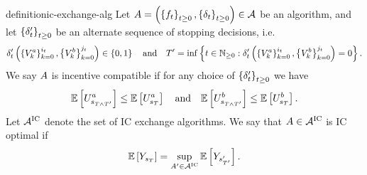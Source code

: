 \begin{restatable}{definition}{ic-exchange-alg}
    \label{def:ic-exchange-alg}
    Let
    \(
        A
        =
        \left(
            \left\{
                f_{t}
            \right\}_{t\geq 0}, 
            \left\{
                \delta_{t}
            \right\}_{t\geq 0}
        \right)
        \in\mathcal{A}
    \) be an algorithm, 
    and let
    \(
        \left\{
            \delta'_{t}
        \right\}_{t\geq 0}
    \)
    be an alternate sequence of stopping decisions, i.e.
    \[
        \delta'_{t}
        \left(
            \left\{
                V^a_{
                    k
                }
            \right\}_{k=0}^{
                i_{t}
            },
            \left\{
                V^b_{
                    k
                }
            \right\}_{k=0}^{
                j_{t}
            }
        \right)
        \in\left\{0,1\right\}
        \quad
        \text{and}
        \quad
        T'
        =\inf\left\{
            t\in\mathbb{N}_{\geq 0} :
            \delta'_{t}\left(
                \left\{
                    V^a_{k}
                \right\}_{k=0}^{i_{t}}
                ,
                \left\{
                    V^b_{k}
                \right\}_{k=0}^{j_{t}}
            \right)=0
        \right\} .
    \]
    We say $A$ is incentive compatible if for any choice of 
    \(
        \left\{
            \delta'_{t}
        \right\}_{t\geq 0}
    \)
    we have
    \[
        \mathbb{E}\left[
            U^a_{
                s_{
                    T\wedge T'
                }
            }
        \right]
        \leq
        \mathbb{E}\left[
            U^a_{
                s_{
                    T
                }
            }
        \right]
        \quad
        \text{and}
        \quad
        \mathbb{E}\left[
            U^b_{
                s_{
                    T\wedge T'
                }
            }
        \right]
        \leq
        \mathbb{E}\left[
            U^b_{
                s_{
                    T
                }
            }
        \right] .
    \] 
    Let $\mathcal{A}^{\text{IC}}$ denote the set of IC exchange algorithms.
    We say that $A\in\mathcal{A}^{\text{IC}}$ is IC optimal if
    \[
        \mathbb{E}\left[
            Y_{
                s_{T}
            }
        \right]
        =
        \sup_{
            A'\in\mathcal{A}^{\text{IC}}
        }
        \mathbb{E}\left[
            Y_{
                s_{T'}'
            }
        \right] .
    \]
\end{restatable}  

